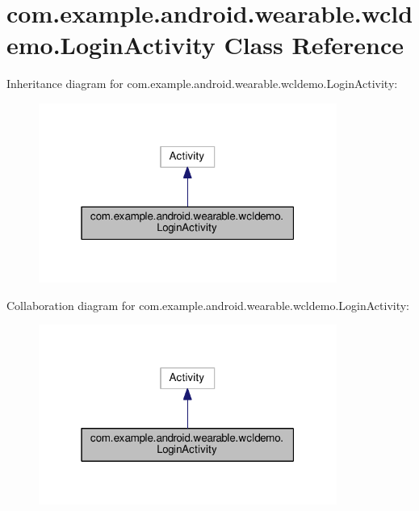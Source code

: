 \hypertarget{classcom_1_1example_1_1android_1_1wearable_1_1wcldemo_1_1LoginActivity}{}\section{com.\+example.\+android.\+wearable.\+wcldemo.\+Login\+Activity Class Reference}
\label{classcom_1_1example_1_1android_1_1wearable_1_1wcldemo_1_1LoginActivity}


Inheritance diagram for com.\+example.\+android.\+wearable.\+wcldemo.\+Login\+Activity\+:
\nopagebreak
\begin{figure}[H]
\begin{center}
\leavevmode
\includegraphics[width=277pt]{de/dbe/classcom_1_1example_1_1android_1_1wearable_1_1wcldemo_1_1LoginActivity__inherit__graph}
\end{center}
\end{figure}


Collaboration diagram for com.\+example.\+android.\+wearable.\+wcldemo.\+Login\+Activity\+:
\nopagebreak
\begin{figure}[H]
\begin{center}
\leavevmode
\includegraphics[width=277pt]{d8/d92/classcom_1_1example_1_1android_1_1wearable_1_1wcldemo_1_1LoginActivity__coll__graph}
\end{center}
\end{figure}

